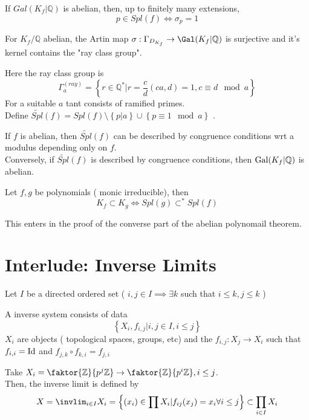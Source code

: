 \documentclass[../main.tex]{subfiles}
\begin{document}
\begin{lemma}
	If $Gal( K_f| \mathbb{Q}) $ is abelian, then, up to finitely many extensions,
	\[ 
	p \in Spl( f) \iff \sigma_p=1
	\]
	
\end{lemma}
\begin{thm}
	For $K_f / \mathbb{Q}$ abelian, the Artin map $\sigma: \Gamma_{D_{K_f} } \to \Gal( K_f| \mathbb{Q}) $ is surjective and it's kernel contains the "ray class group".
\end{thm}
Here the ray class group is 
\[ 
\Gamma_a ^{( ray) }= \left\{ r\in \mathbb{Q}^{*}| r= \frac{c}{d} ( ca,d) =1, c\equiv d \mod a \right\} 
\]
For a suitable $a$ tant consists of ramified primes.\\
Define $\tilde{Spl}( f)= Spl( f) \setminus \left\{ p|a \right\}  \cup \left\{ p\equiv 1 \mod a \right\}  $ .
\begin{thm}
	If $f$ is abelian, then $\tilde { Spl} ( f) $ can be described by congruence conditions wrt a modulus depending only on $f$.\\
	Conversely, if $ \tilde{Spl} ( f) $ is described by congruence conditions, then $\operatorname{Gal}( K_f| \mathbb{Q}) $ is abelian.
\end{thm}
\begin{thm}
	Let $f,g$ be polynomials ( monic irreducible), then
	\[ 
	K_f \subset K_g \iff Spl( g) \subset ^{\ast}Spl( f) 
	\]
\end{thm}
This enters in the proof of the converse part of the abelian polynomail theorem.
\section{Interlude: Inverse Limits}
Let $I$ be a directed ordered set  ( $i,j\in I\implies \exists k $ such that $i \leq k, j \leq k$  ) 
\begin{defn}
	A inverse system consists of data
	\[ 
	\left\{ X_i, f_{i,j} | i,j \in I, i \leq j \right\} 
	\]
	$X_i$ are objects ( topological spaces, groups, etc) and the $f_{i,j} :X_j \to X_i$ such that $f_{i,i} = \operatorname{Id}$ and $f_{j,k} \circ f_{k,i} = f_{j,i}  $ 
\end{defn}
\begin{exemple}
Take $X_i = \faktor{\mathbb{Z}}{p^{j}\mathbb{Z}}\to \faktor{\mathbb{Z}}{p^{i} \mathbb{Z}}, i \leq j $.\\
Then, the inverse limit is defined by 
\[ 
X= \invlim_{i \in I} X_i = \left\{ ( x_i) \in \prod X_i | f_{ij} ( x_j) = x_i \forall i \leq  j \right\}  \subset \prod_{i \in I} X_i
\]

\end{exemple}
\end{document}
